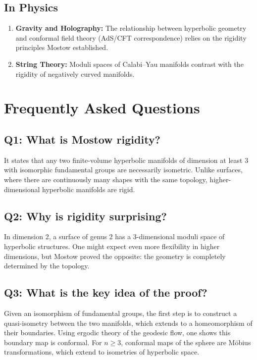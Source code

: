 \subsection{In Physics}

\begin{enumerate}
    \item \textbf{Gravity and Holography:} The relationship between hyperbolic geometry and conformal field theory (AdS/CFT correspondence) relies on the rigidity principles Mostow established.
    \item \textbf{String Theory:} Moduli spaces of Calabi--Yau manifolds contrast with the rigidity of negatively curved manifolds.
\end{enumerate}

\section{Frequently Asked Questions}

\subsection*{Q1: What is Mostow rigidity?}
It states that any two finite-volume hyperbolic manifolds of dimension at least 3 with isomorphic fundamental groups are necessarily isometric. Unlike surfaces, where there are continuously many shapes with the same topology, higher-dimensional hyperbolic manifolds are rigid.

\subsection*{Q2: Why is rigidity surprising?}
In dimension 2, a surface of genus 2 has a 3-dimensional moduli space of hyperbolic structures. One might expect even more flexibility in higher dimensions, but Mostow proved the opposite: the geometry is completely determined by the topology.

\subsection*{Q3: What is the key idea of the proof?}
Given an isomorphism of fundamental groups, the first step is to construct a quasi-isometry between the two manifolds, which extends to a homeomorphism of their boundaries. Using ergodic theory of the geodesic flow, one shows this boundary map is conformal. For $n \geq 3$, conformal maps of the sphere are M\"obius transformations, which extend to isometries of hyperbolic space.

